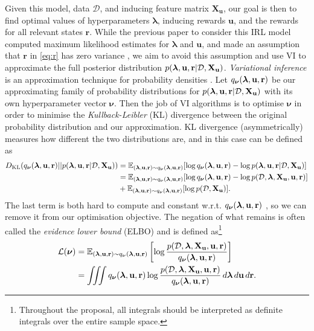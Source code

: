 \documentclass{mprop}
\theoremstyle{definition}
\begin{document}
Given this model, data $\mathcal{D}$, and inducing feature matrix
$\mathbf{X_u}$, our goal is then to find optimal values of hyperparameters
$\bm\lambda$, inducing rewards $\mathbf{u}$, and the rewards for all relevant
states $\mathbf{r}$. While the previous paper to consider this IRL model
computed maximum likelihood estimates for $\bm\lambda$ and $\mathbf{u}$, and
made an assumption that $\mathbf{r}$ in \eqref{eq:r} has zero variance
\cite{DBLP:conf/nips/LevinePK11}, we aim to avoid this assumption and use
VI to approximate the full posterior distribution $p(\bm\lambda, \mathbf{u}, \mathbf{r} | \mathcal{D}, \mathbf{X_u})$.
\emph{Variational inference} is an approximation technique for probability
densities \cite{blei2017variational}. Let $q_{\bm\nu}(\bm\lambda, \mathbf{u}, \mathbf{r})$ be our approximating
family of probability distributions for $p(\bm\lambda, \mathbf{u}, \mathbf{r} | \mathcal{D}, \mathbf{X_u})$ with its own hyperparameter
vector $\bm\nu$. Then the job of VI algorithms is to optimise $\bm\nu$ in order
to minimise the \emph{Kullback-Leibler} (KL) divergence between the original
probability distribution and our approximation.  KL divergence (asymmetrically)
measures how different the two distributions are, and in this case can be
defined as \cite{blei2017variational}
\[ \begin{split}
    D_{\mathrm{KL}}(q_{\bm\nu}(\bm\lambda, \mathbf{u}, \mathbf{r}) || p(\bm\lambda, \mathbf{u}, \mathbf{r} | \mathcal{D}, \mathbf{X_u})) &= \mathbb{E}_{(\bm\lambda, \mathbf{u}, \mathbf{r}) \sim q_{\bm\nu}(\bm\lambda, \mathbf{u}, \mathbf{r})} [\log q_{\bm\nu}(\bm\lambda, \mathbf{u}, \mathbf{r}) -
    \log p(\bm\lambda, \mathbf{u}, \mathbf{r} | \mathcal{D}, \mathbf{X_u}) ] \\
    &= \mathbb{E}_{(\bm\lambda, \mathbf{u}, \mathbf{r}) \sim q_{\bm\nu}(\bm\lambda, \mathbf{u}, \mathbf{r})}[\log q_{\bm\nu}(\bm\lambda, \mathbf{u}, \mathbf{r}) - \log p(\mathcal{D}, \bm\lambda, \mathbf{X_u}, \mathbf{u}, \mathbf{r})] \\
    &+ \mathbb{E}_{(\bm\lambda, \mathbf{u}, \mathbf{r}) \sim q_{\bm\nu}(\bm\lambda, \mathbf{u}, \mathbf{r})}[\log p(\mathcal{D}, \mathbf{X_u})].
  \end{split}
\]
The last term is both hard to compute and constant w.r.t. $q_{\bm\nu}(\bm\lambda, \mathbf{u}, \mathbf{r})$
\cite{blei2017variational}, so we can remove it from our optimisation objective.
The negation of what remains is often called the \emph{evidence lower bound}
(ELBO) and is defined as\footnote{Throughout the proposal, all integrals should
  be interpreted as definite integrals over the entire sample space.}
\cite{DBLP:books/lib/Bishop07,blei2017variational}
\begin{equation} \label{eq:elbo}
  \begin{split}
    \mathcal{L}(\bm\nu) &= \mathbb{E}_{(\bm\lambda, \mathbf{u}, \mathbf{r}) \sim q_{\bm\nu}(\bm\lambda, \mathbf{u}, \mathbf{r})} \left[ \log \frac{p(\mathcal{D}, \bm\lambda, \mathbf{X_u}, \mathbf{u}, \mathbf{r})}{q_{\bm\nu}(\bm\lambda, \mathbf{u}, \mathbf{r})}
    \right] \\
    &= \iiint q_{\bm\nu}(\bm\lambda, \mathbf{u}, \mathbf{r}) \log
    \frac{p(\mathcal{D}, \bm\lambda, \mathbf{X_u}, \mathbf{u}, \mathbf{r})}{q_{\bm\nu}(\bm\lambda, \mathbf{u}, \mathbf{r})}\,d\bm\lambda\,d\mathbf{u}\,d\mathbf{r}.
  \end{split}
\end{equation}
\end{document}
